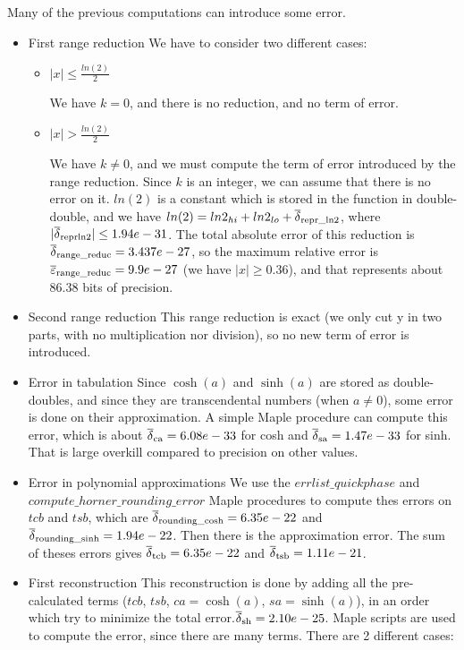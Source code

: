 Many of the previous computations can introduce some error.
\begin{itemize}
\item{First range reduction}
We have to consider two different cases:
\begin{itemize}
\item{$|x| \leq \frac{ln(2)}{2}$}

We have $k = 0$, and there is no reduction, and no term of error.
\item{$|x| > \frac{ln(2)}{2}$}

  We have $k \neq 0$, and we must compute the term of error introduced
  by the range reduction.  Since $k$ is an integer, we can assume that
  there is no error on it.  $ln(2)$ is a constant which is stored in
  the function in double-double, and we have $ln(2) =
  ln2_{hi} + ln2_{lo} + {\overline{\delta}}_{\mathrm{repr\_ln2}}$, where
  $|{\overline{\delta}}_{\mathrm{repr ln2}}| \leq 1.94e-31$.  The total absolute error of
  this reduction is ${\overline{\delta}}_{\mathrm{range\_reduc}} = 3.437e-27$, so the
  maximum relative error is ${\overline{\varepsilon}}_{\mathrm{range\_reduc}} = 9.9e-27$ (we
  have $|x| \geq 0.36$), and that represents about $86.38$ bits of
  precision.

\end{itemize}

\item{Second range reduction} This range reduction is exact (we only
  cut y in two parts, with no multiplication nor division), so no new
  term of error is introduced.

\item{Error in tabulation} Since $\cosh(a)$ and $\sinh(a)$ are stored as
  double-doubles, and since they are transcendental numbers (when $a
  \neq 0$), some error is done on their approximation.  A simple Maple
  procedure can compute this error, which is about ${\overline{\delta}}_{\mathrm{ca}} =
  6.08e-33$ for cosh and ${\overline{\delta}}_{\mathrm{sa}} = 1.47e-33$ for sinh. That is
  large overkill compared to precision on other values.

\item{Error in polynomial approximations} We use the
  $errlist\_quickphase$ and $compute\_horner\_rounding\_error$ Maple
  procedures to compute thes errors on $tcb$ and $tsb$, which are
  ${\overline{\delta}}_{\mathrm{rounding\_cosh}} = 6.35e-22$ and
  ${\overline{\delta}}_{\mathrm{rounding\_sinh}} = 1.94e-22$. Then there is the approximation error. The sum of theses errors
  gives ${\overline{\delta}}_{\mathrm{tcb}} = 6.35e-22$ and ${\overline{\delta}}_{\mathrm{tsb}} = 1.11e-21$.

\item{First reconstruction} This reconstruction is done by adding all
  the pre-calculated terms ($tcb$, $tsb$, $ca = \cosh(a)$, $sa =
  \sinh(a)$), in an order which try to minimize the total
  error.${\overline{\delta}}_{\mathrm{sh}} = 2.10e-25$. Maple scripts are used to compute
  the error, since there are many terms.  There are 2 different cases:
\begin{itemize}


\end{itemize}
\end{itemize}
